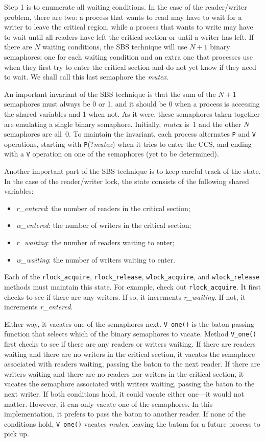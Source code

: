 \documentclass{report}
\begin{document}
Step 1 is to enumerate all waiting conditions.  In the case of the reader/writer
problem, there are two: a process that wants to read may have to wait for a
writer to leave the critical region, while a process that wants to write may
have to wait until all readers have left the critical section or until a writer has left.  If there are $N$
waiting conditions, the SBS technique will use $N+1$ binary semaphores: one for
each waiting condition and an extra one that processes use when they first try
to enter the critical section and do not yet know if they need to wait.
We shall call this last semaphore the \textit{mutex}.

An important invariant of the SBS technique is that the sum of the $N+1$ semaphores
must always be 0 or 1, and it should be 0 when a process is accessing the shared
variables and 1 when not.
As it were, these semaphores taken together are emulating a single binary semaphore.
Initially, \textit{mutex} is~1 and the other $N$ semaphores
are all~0.  To maintain the invariant, each process alternates \texttt{P} and
\texttt{V} operations, starting with \texttt{P}(?\textit{mutex}) when it tries to
enter the CCS, and ending with a \texttt{V} operation on one of the semaphores
(yet to be determined).

Another important part of the SBS technique is to keep careful track of the
state.  In the case of the reader/writer lock, the state consists of the
following shared variables:
\begin{itemize}
\item \textit{r\_entered}: the number of readers in the critical section;
\item \textit{w\_entered}: the number of writers in the critical section;
\item \textit{r\_waiting}: the number of readers waiting to enter;
\item \textit{w\_waiting}: the number of writers waiting to enter.
\end{itemize}
Each of the
\texttt{rlock\_acquire}, \texttt{rlock\_release},
\texttt{wlock\_acquire}, and \texttt{wlock\_release} methods must maintain
this state.
For example, check out \texttt{rlock\_acquire}.
It first checks to see if there
are any writers.  If so, it increments \textit{r\_waiting}.
If not, it increments \textit{r\_entered}.

Either way, it vacates one of the semaphores next.
\texttt{V\_one()} is the baton passing function that selects which of the
binary semaphores to vacate.
Method \texttt{V\_one()} first checks to see if there are any readers or
writers waiting.  If there are readers waiting and there are no writers
in the critical section, it vacates the semaphore associated with
readers waiting, passing the baton to the next reader.
If there are writers waiting and there are no readers
nor writers in the critical section, it vacates the semaphore associated
with writers waiting, passing the baton to the next writer.
If both conditions hold, it could vacate either
one---it would not matter.
However, it can only vacate one of the semaphores.
In this implementation, it prefers to pass the baton to another reader.
If none of the conditions hold, \texttt{V\_one()} vacates \textit{mutex},
leaving the batom for a future process to pick up.
\end{document}
